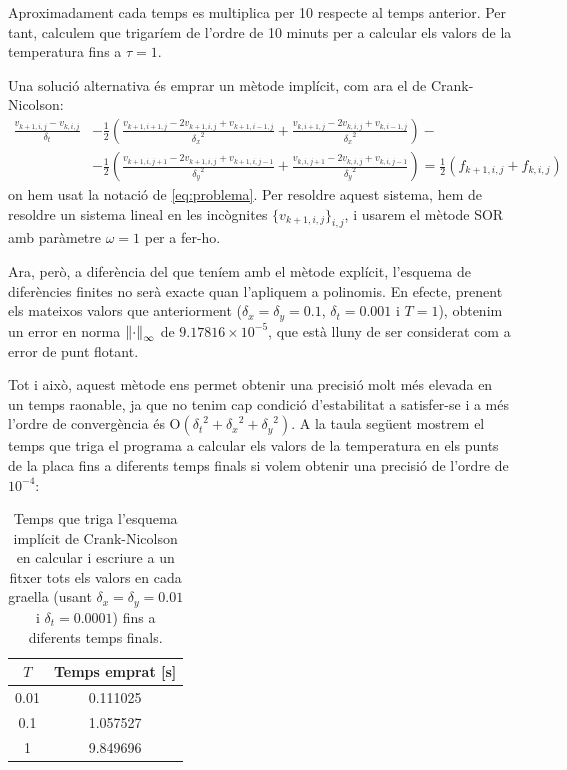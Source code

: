 \documentclass[10pt,a4paper]{article}
\renewcommand{\O}[1]{\mathrm{O}\left(#1\right)} %
\theoremstyle{definition}
\theoremstyle{remark}
\begin{document}
Aproximadament cada temps es multiplica per 10 respecte al temps anterior. Per tant, calculem que trigaríem de l'ordre de 10 minuts per a calcular els valors de la temperatura fins a $\tau=1$.\vspace{0.25cm}

Una solució alternativa és emprar un mètode implícit, com ara el de Crank-Nicolson:
\begin{align*}
  \frac{v_{k+1,i,j}-v_{k,i,j}}{\delta_t} & - \frac{1}{2}\left(\frac{v_{k+1,i+1,j}-2v_{k+1,i,j}+v_{k+1,i-1,j}}{{\delta_x}^2} +\frac{v_{k,i+1,j}-2v_{k,i,j}+v_{k,i-1,j}}{{\delta_x}^2} \right)  -                                             \\
                                         & -\frac{1}{2}\left( \frac{v_{k+1,i,j+1}-2v_{k+1,i,j}+v_{k+1,i,j-1}}{{\delta_y}^2}+ \frac{v_{k,i,j+1}-2v_{k,i,j}+v_{k,i,j-1}}{{\delta_y}^2}\right) = \frac{1}{2}\left(f_{k+1,i,j}+f_{k,i,j}\right)
\end{align*}
on hem usat la notació de \eqref{eq:problema}. Per resoldre aquest sistema, hem de resoldre un sistema lineal en les incògnites $\{v_{k+1,i,j}\}_{i,j}$, i usarem el mètode SOR amb paràmetre $\omega = 1$ per a fer-ho.

Ara, però, a diferència del que teníem amb el mètode explícit, l'esquema de diferències finites no serà exacte quan l'apliquem a polinomis. En efecte, prenent els mateixos valors que anteriorment ($\delta_x=\delta_y=0.1$, $\delta_t=0.001$ i $T=1$), obtenim un error en norma $\norm{\cdot}_\infty$ de $9.17816\times 10^{-5}$, que està lluny de ser considerat com a error de punt flotant.

Tot i això, aquest mètode ens permet obtenir una precisió molt més elevada en un temps raonable, ja que no tenim cap condició d'estabilitat a satisfer-se i a més l'ordre de convergència és $\O{{\delta_t}^2 + {\delta_x}^2 + {\delta_y}^2}$. A la taula següent mostrem el temps que triga el programa a calcular els valors de la temperatura en els punts de la placa fins a diferents temps finals si volem obtenir una precisió de l'ordre de $10^{-4}$:
\begin{table}[ht]
  \centering
  \begin{tabular}{|c|c|}
    \hline
    $T$  & Temps emprat [s] \\ \hline\hline
    0.01 & 0.111025         \\
    0.1  & 1.057527         \\
    1    & 9.849696         \\
    \hline
  \end{tabular}
  \caption{Temps que triga l'esquema implícit de Crank-Nicolson en calcular i escriure a un fitxer tots els valors en cada graella (usant $\delta_x= \delta_y=0.01$ i $\delta_t=0.0001$) fins a diferents temps finals.}
\end{table}
\end{document}
